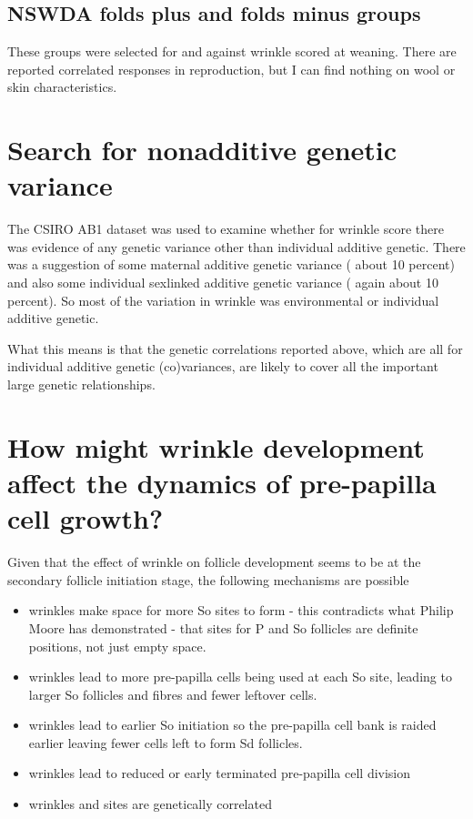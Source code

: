 \documentclass[titlepage]{article}  %
\begin{document}
\subsection{NSWDA folds plus and folds minus groups}
These groups were selected for and against wrinkle scored at weaning. There are reported correlated responses in reproduction, but I can find nothing on wool or skin characteristics.

\section{Search for nonadditive genetic variance}
The CSIRO AB1 dataset was used to examine whether for wrinkle score there was evidence of any genetic variance other than individual additive genetic. There was a suggestion of some maternal additive genetic variance ( about 10 percent) and also some individual sexlinked additive genetic variance ( again about 10 percent). So most of the variation in wrinkle was environmental or individual additive genetic. 

What this means is that the genetic correlations reported above, which are all for individual additive genetic (co)variances, are likely to cover all the important large genetic relationships. 

\section{How might wrinkle development affect the dynamics of pre-papilla cell growth?}
Given that the effect of wrinkle on follicle development seems to be at the secondary follicle initiation stage, the following mechanisms are possible
\begin{itemize}
\item wrinkles make space for more So sites to form - this contradicts what Philip Moore has demonstrated - that sites for P and So follicles are definite positions, not just empty space.
\item wrinkles lead to more pre-papilla cells being used at each So site, leading to larger So follicles and fibres and fewer leftover cells.
\item wrinkles lead to earlier So initiation so the pre-papilla cell bank is raided earlier leaving fewer cells left to form Sd follicles.
\item wrinkles lead to reduced or early terminated pre-papilla cell division
\item wrinkles and sites are genetically correlated
\end{itemize}
\end{document}
